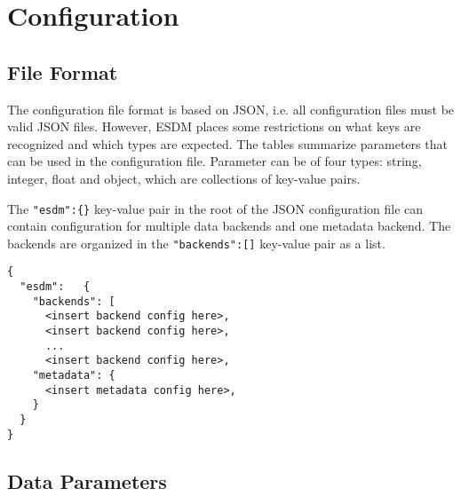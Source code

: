 \section{Configuration}

\subsection{File Format}
The configuration file format is based on JSON, i.e. all configuration files must be valid JSON files.
However, ESDM places some restrictions on what keys are recognized and which types are expected.
The tables summarize parameters that can be used in the configuration file.
Parameter can be of four types: string, integer, float and object, which are collections of key-value pairs.

The \lstinline|"esdm":{}| key-value pair in the root of the JSON configuration file can contain configuration for multiple data backends and one metadata backend.
The backends are organized in the \lstinline|"backends":[]| key-value pair as a list.



\begin{lstlisting}
{
  "esdm":	{
    "backends": [
      <insert backend config here>,
      <insert backend config here>,
      ...
      <insert backend config here>,
    "metadata": {
      <insert metadata config here>,
    }
  }
}
\end{lstlisting}


\subsection{Data Parameters}

